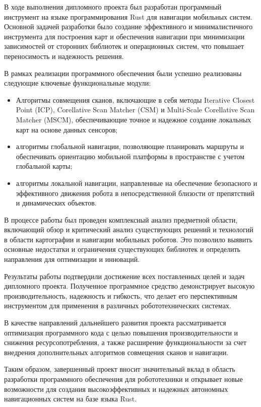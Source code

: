 В ходе выполнения дипломного проекта был разработан программный инструмент на языке программирования Rust для навигации мобильных систем. Основной задачей разработки было создание эффективного и минималистичного инструмента для построения карт и обеспечения навигации при минимизации зависимостей от сторонних библиотек и операционных систем, что повышает переносимость и надежность решения.

В рамках реализации программного обеспечения были успешно реализованы следующие ключевые функциональные модули:

\begin{itemize}
	\item Алгоритмы совмещения сканов, включающие в себя методы Iterative Closest Point (ICP), Corellative Scan Matcher (CSM) и Multi-Scale Corellative Scan Matcher (MSCM), обеспечивающие точное и надежное создание локальных карт на основе данных сенсоров;
	\item алгоритмы глобальной навигации, позволяющие планировать маршруты и обеспечивать ориентацию мобильной платформы в пространстве с учетом глобальной карты;
	\item алгоритмы локальной навигации, направленные на обеспечение безопасного и эффективного движения робота в непосредственной близости от препятствий и динамических объектов.
\end{itemize}


В процессе работы был проведен комплексный анализ предметной области, включающий обзор и критический анализ существующих решений и технологий в области картографии и навигации мобильных роботов. Это позволило выявить основные недостатки и ограничения существующих библиотек и определить направления для оптимизации и инноваций.

Результаты работы подтвердили достижение всех поставленных целей и задач дипломного проекта. Полученное программное средство демонстрирует высокую производительность, надежность и гибкость, что делает его перспективным инструментом для применения в различных робототехнических системах.

В качестве направлений дальнейшего развития проекта рассматривается оптимизация программного кода с целью повышения производительности и снижения ресурсопотребления, а также расширение функциональности за счет внедрения дополнительных алгоритмов совмещения сканов и навигации.

Таким образом, завершенный проект вносит значительный вклад в область разработки программного обеспечения для робототехники и открывает новые возможности для создания высокоэффективных и надежных автономных навигационных систем на базе языка Rust.
